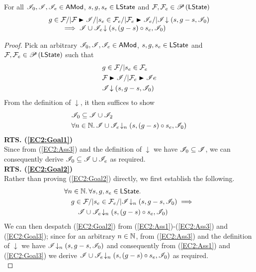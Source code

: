\begin{lemma}\label{lem:extend-closure-2}
For all $\mathscr{I}_0, \mathscr{I}{}, \mathscr{I}_{e} \in \textsf{AMod}$, $s, g, s_e \in \textsf{LState}$ and $\mathcal{F}_{}, \mathcal{F}_{e} \in \mathscr{P}\left(\textsf{LState} \right)$
%
\[
\begin{array}{l}
	g \in \fence{} /| \fence{} \strictfences \lmod /|
	s_e \in \fence{e} /| \fence{e} \strictfences \lmod_{e} /|
	\extendsAM{\lmod}{s}{g-s}{\lmod_0}\\
	\qquad\implies
	\extendsAM{\lmod \cup \lmod_{e}}{s}{(g-s) \composeL s_e}{\lmod_{0}}
\end{array}
\]
%
\begin{proof} Pick an arbitrary $\mathscr{I}_0, \mathscr{I}, \mathscr{I}_e \in \textsf{AMod}$, $s, g, s_e \in \textsf{LState}$ and $\mathcal{F}_{}, \mathcal{F}_{e} \in \mathscr{P}\left(\textsf{LState} \right)$ such that 
%
\begin{align}
	& g \in \fence{} /| s_e \in \fence{e}  \label{EC2:Ass1}\\
	& \fence{} \strictfences \lmod /| \fence{e} \strictfences \lmod{e} \label{EC2:Ass2}\\
	& \extendsAM{\lmod}{s}{g-s}{\lmod_0} \label{EC2:Ass3}
\end{align} 
%
From the definition of $\downarrow$, it then suffices to show
%
\begin{align}
	& \mathscr{I}_0 \subseteq \mathscr{I} \cup \mathscr{I}_2\label{EC2:Goal1}\\
	& \forall n \in \mathbb{N}.\,  \mathscr{I} \cup \mathscr{I}_e \!\downarrow_{n} \left(s, (g-s) \circ s_e, \mathscr{I}_0\right) \label{EC2:Goal2}
\end{align}
%
\noindent\textbf{RTS. (\ref{EC2:Goal1})} \\
Since from (\ref{EC2:Ass3}) and the definition of $\downarrow$ we have $\mathscr{I}_0 \subseteq \mathscr{I}$, we can consequently derive $\mathscr{I}_0 \subseteq \mathscr{I} \cup \mathscr{I}_e$ as required.\\

\noindent\textbf{RTS. (\ref{EC2:Goal2})} \\
Rather than proving (\ref{EC2:Goal2}) directly, we first establish the following.
%
\begin{align}
	& \forall n \in \mathbb{N}.\, \forall s, g, s_e \in \textsf{LState}.\, \nonumber\\
	& \quad g \in \mathcal{F}_{} /|  s_e \in \mathcal{F}_{e} /| \mathscr{I} \!\downarrow_{n} \left(s, g-s, \mathscr{I}_0\right) \implies \nonumber\\
	& \qquad \mathscr{I} \cup \mathscr{I}_e \!\downarrow_{n} \left(s, (g-s) \circ s_e, \mathscr{I}_0\right) \label{EC2:Goal3}
\end{align}
%
We can then despatch (\ref{EC2:Goal2}) from (\ref{EC2:Ass1})-(\ref{EC2:Ass3}) and (\ref{EC2:Goal3}); since for an arbitrary $n \in \mathbb{N}$, from (\ref{EC2:Ass3}) and the definition of $\downarrow$ we have $\mathscr{I} \!\downarrow_{n} \left(s, g-s, \mathscr{I}_0\right)$ and consequently from (\ref{EC2:Ass1}) and (\ref{EC2:Goal3}) we derive $\mathscr{I} \cup \mathscr{I}_e \!\downarrow_{n} \left(s, (g-s) \circ s_e, \mathscr{I}_0\right) $ as required. \\


\end{proof}
\end{lemma}
